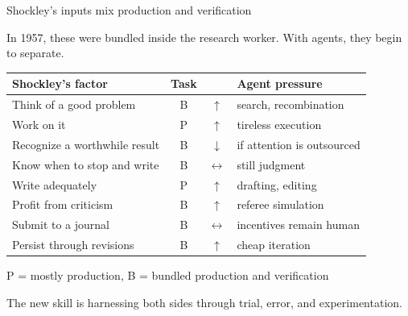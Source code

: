 \documentclass[aspectratio=169,11pt]{beamer}
\begin{document}
\begin{frame}{Shockley's inputs mix production and verification}

In 1957, these were bundled inside the research worker. With agents, they begin to separate.

\vspace{0.08cm}

\begin{center}
\scriptsize
\renewcommand{\arraystretch}{1.05}
\begin{tabular}{@{}p{}ccl@{}}
\toprule
Shockley's factor & Task & & Agent pressure \\
\midrule
Think of a good problem & B & \textcolor{forest}{\Large $\uparrow$} & search, recombination \\
Work on it & P & \textcolor{forest}{\Large $\uparrow$} & tireless execution \\
Recognize a worthwhile result & B & \textcolor{mitcardinal}{\Large $\downarrow$} & if attention is outsourced \\
Know when to stop and write & B & \textcolor{warmgray}{\Large $\leftrightarrow$} & still judgment \\
Write adequately & P & \textcolor{forest}{\Large $\uparrow$} & drafting, editing \\
Profit from criticism & B & \textcolor{forest}{\Large $\uparrow$} & referee simulation \\
Submit to a journal & B & \textcolor{warmgray}{\Large $\leftrightarrow$} & incentives remain human \\
Persist through revisions & B & \textcolor{forest}{\Large $\uparrow$} & cheap iteration \\
\bottomrule
\end{tabular}
\end{center}

\vspace{0.05cm}
\textcolor{warmgray}{\scriptsize P = mostly production, B = bundled production and verification}

\vspace{0.08cm}
\alert{The new skill is harnessing both sides through trial, error, and experimentation.}

\end{frame}
\end{document}
